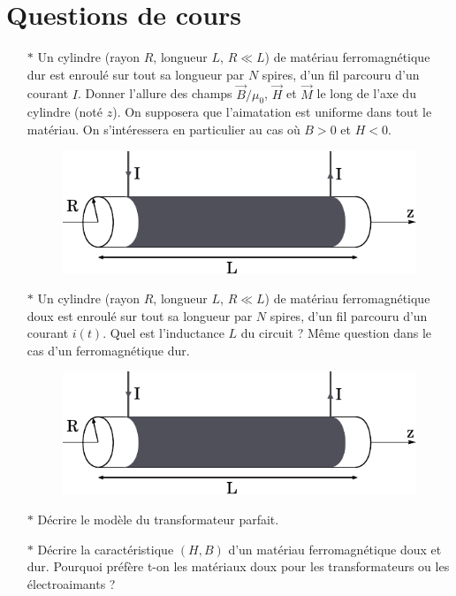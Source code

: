 \documentclass{report}
\begin{document}
\section*{Questions de cours}

\begin{itemize}

	\item[$\ast$] Un cylindre (rayon $R$, longueur $L$, $R\ll L$) de matériau ferromagnétique dur est enroulé sur tout sa longueur par $N$ spires, d'un fil parcouru d'un courant $I$. Donner l'allure des champs $\vec{B}/\mu_0$, $\vec{H}$ et $\vec{M}$ le long de l'axe du cylindre (noté $z$). On supposera que l'aimatation est uniforme dans tout le matériau. On s'intéressera en particulier au cas où $B>0$ et $H<0$.
	
		\begin{figure}[h!]
	\centering
		\includegraphics[scale=0.7]{ferro.pdf}
	\end{figure}	
	
	\item[$\ast$] Un cylindre (rayon $R$, longueur $L$, $R\ll L$) de matériau ferromagnétique doux est enroulé sur tout sa longueur par $N$ spires, d'un fil parcouru d'un courant $i(t)$. Quel est l'inductance $L$ du circuit ? Même question dans le cas d'un ferromagnétique dur. 
	
	\begin{figure}[h!]
	\centering
		\includegraphics[scale=0.7]{ferro.pdf}
	\end{figure}	
	
	\item[$\ast$] Décrire le modèle du transformateur parfait.
	
	\item[$\ast$] Décrire la caractéristique $(H,B)$ d'un matériau ferromagnétique doux et dur. Pourquoi préfère t-on les matériaux doux pour les transformateurs ou les électroaimants ?

\end{itemize}
\end{document}
